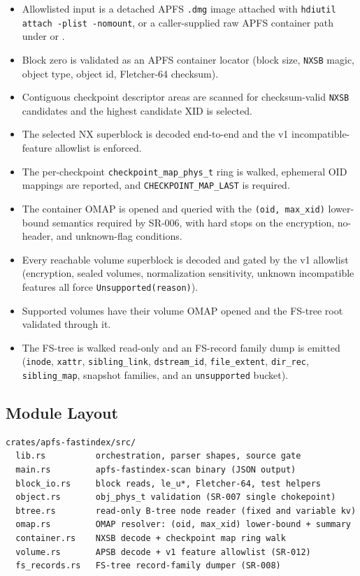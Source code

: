 \begin{itemize}
  \item Allowlisted input is a detached APFS \texttt{.dmg} image attached with
  \texttt{hdiutil attach -plist -nomount}, or a caller-supplied raw APFS
  container path under  or .
  \item Block zero is validated as an APFS container locator (block size,
  \texttt{NXSB} magic, object type, object id, Fletcher-64 checksum).
  \item Contiguous checkpoint descriptor areas are scanned for checksum-valid
  \texttt{NXSB} candidates and the highest candidate XID is selected.
  \item The selected NX superblock is decoded end-to-end and the v1
  incompatible-feature allowlist is enforced.
  \item The per-checkpoint \texttt{checkpoint\_map\_phys\_t} ring is walked,
  ephemeral OID mappings are reported, and \texttt{CHECKPOINT\_MAP\_LAST} is
  required.
  \item The container OMAP is opened and queried with the
  \texttt{(oid, max\_xid)} lower-bound semantics required by SR-006, with
  hard stops on the encryption, no-header, and unknown-flag conditions.
  \item Every reachable volume superblock is decoded and gated by the v1
  allowlist (encryption, sealed volumes, normalization sensitivity, unknown
  incompatible features all force \texttt{Unsupported(reason)}).
  \item Supported volumes have their volume OMAP opened and the FS-tree root
  validated through it.
  \item The FS-tree is walked read-only and an FS-record family dump is
  emitted (\texttt{inode}, \texttt{xattr}, \texttt{sibling\_link},
  \texttt{dstream\_id}, \texttt{file\_extent}, \texttt{dir\_rec},
  \texttt{sibling\_map}, snapshot families, and an \texttt{unsupported}
  bucket).
\end{itemize}

\subsection{Module Layout}

\begin{verbatim}
crates/apfs-fastindex/src/
  lib.rs          orchestration, parser shapes, source gate
  main.rs         apfs-fastindex-scan binary (JSON output)
  block_io.rs     block reads, le_u*, Fletcher-64, test helpers
  object.rs       obj_phys_t validation (SR-007 single chokepoint)
  btree.rs        read-only B-tree node reader (fixed and variable kv)
  omap.rs         OMAP resolver: (oid, max_xid) lower-bound + summary
  container.rs    NXSB decode + checkpoint map ring walk
  volume.rs       APSB decode + v1 feature allowlist (SR-012)
  fs_records.rs   FS-tree record-family dumper (SR-008)
\end{verbatim}

